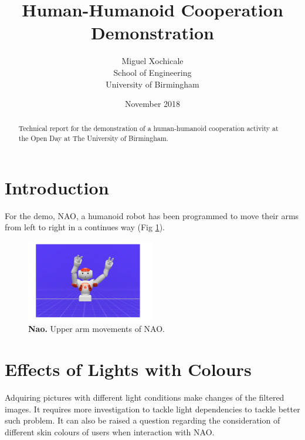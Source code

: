 \documentclass[12pt]{article}
\title{Human-Humanoid Cooperation Demonstration}
\author{Miguel Xochicale \\ 
School of Engineering \\
University of Birmingham
}
\date{November 2018}
\begin{document}
\maketitle


\begin{abstract}
Technical report for the demonstration of a human-humanoid cooperation 
activity at the Open Day at The University of Birmingham.
\end{abstract}

\section{Introduction}
For the demo, NAO, a humanoid robot \cite{gouaillier2008} has been programmed 
to move their arms from left to right in a continues way (Fig \ref{fig:nao}).




\begin{figure}[!ht]
\centering
\includegraphics[width=0.5\textwidth]{nao/naoarms}
    \caption{
	{\bf Nao.}
	 Upper arm movements of NAO.
        }
\label{fig:nao}
\end{figure}




\section{Effects of Lights with Colours}
Adquiring pictures with different light conditions
make changes of the filtered images.
It requires more investigation to tackle light 
dependencies to tackle better such problem.
It can also be raised a question regarding the consideration
of different skin colours of users when interaction with NAO.



\newpage



\end{document}
